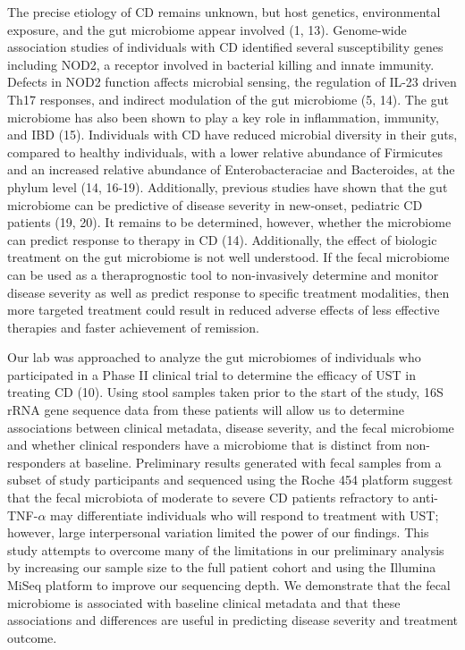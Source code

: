 \documentclass[11pt,]{article}
\begin{document}
The precise etiology of CD remains unknown, but host genetics,
environmental exposure, and the gut microbiome appear involved (1, 13).
Genome-wide association studies of individuals with CD identified
several susceptibility genes including NOD2, a receptor involved in
bacterial killing and innate immunity. Defects in NOD2 function affects
microbial sensing, the regulation of IL-23 driven Th17 responses, and
indirect modulation of the gut microbiome (5, 14). The gut microbiome
has also been shown to play a key role in inflammation, immunity, and
IBD (15). Individuals with CD have reduced microbial diversity in their
guts, compared to healthy individuals, with a lower relative abundance
of Firmicutes and an increased relative abundance of Enterobacteraciae
and Bacteroides, at the phylum level (14, 16-19). Additionally, previous
studies have shown that the gut microbiome can be predictive of disease
severity in new-onset, pediatric CD patients (19, 20). It remains to be
determined, however, whether the microbiome can predict response to
therapy in CD (14). Additionally, the effect of biologic treatment on
the gut microbiome is not well understood. If the fecal microbiome can
be used as a theraprognostic tool to non-invasively determine and
monitor disease severity as well as predict response to specific
treatment modalities, then more targeted treatment could result in
reduced adverse effects of less effective therapies and faster
achievement of remission.

Our lab was approached to analyze the gut microbiomes of individuals who
participated in a Phase II clinical trial to determine the efficacy of
UST in treating CD (10). Using stool samples taken prior to the start of
the study, 16S rRNA gene sequence data from these patients will allow us
to determine associations between clinical metadata, disease severity,
and the fecal microbiome and whether clinical responders have a
microbiome that is distinct from non-responders at baseline. Preliminary
results generated with fecal samples from a subset of study participants
and sequenced using the Roche 454 platform suggest that the fecal
microbiota of moderate to severe CD patients refractory to
anti-TNF-\({\alpha}\) may differentiate individuals who will respond to
treatment with UST; however, large interpersonal variation limited the
power of our findings. This study attempts to overcome many of the
limitations in our preliminary analysis by increasing our sample size to
the full patient cohort and using the Illumina MiSeq platform to improve
our sequencing depth. We demonstrate that the fecal microbiome is
associated with baseline clinical metadata and that these associations
and differences are useful in predicting disease severity and treatment
outcome.
\end{document}
